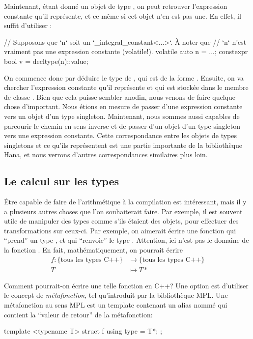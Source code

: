 Maintenant, étant donné un objet de type , on
peut retrouver l'expression constante qu'il représente, et ce même si cet objet
n'en est pas une. En effet, il suffit d'utiliser :
\begin{cpp}
    // Supposons que `n` soit un `_integral_constant<...>`. À noter que
    // `n` n'est vraiment pas une expression constante (volatile!).
    volatile auto n = ...;
    constexpr bool v = decltype(n)::value;
\end{cpp}

On commence donc par déduire le type de , qui est de la forme
. Ensuite, on va chercher l'expression
constante qu'il représente et qui est stockée dans le membre de classe
. Bien que cela puisse sembler anodin, nous venons de faire
quelque chose d'important. Nous étions en mesure de passer d'une expression
constante vers un objet d'un type singleton. Maintenant, nous sommes aussi
capables de parcourir le chemin en sens inverse et de passer d'un objet d'un
type singleton vers une expression constante. Cette correspondance entre les
objets de types singletons et ce qu'ils représentent est une partie importante
de la bibliothèque Hana, et nous verrons d'autres correspondances similaires
plus loin.


\subsection{Le calcul sur les types}
Être capable de faire de l'arithmétique à la compilation est intéressant, mais
il y a plusieurs autres choses que l'on souhaiterait faire. Par exemple, il
est souvent utile de manipuler des types comme s'ils étaient des objets, pour
effectuer des transformations sur ceux-ci. Par exemple, on aimerait écrire
une fonction  qui ``prend'' un type , et qui ``renvoie'' le
type . Attention, ici  n'est pas le domaine de la fonction
. En fait, mathématiquement, on pourrait écrire
\begin{align*}
    f : \{\text{tous les types C++}\} &\to \{\text{tous les types C++}\}\\
                             T &\mapsto T*
\end{align*}

Comment pourrait-on écrire une telle fonction en C++? Une option est d'utiliser
le concept de \textit{métafonction}, tel qu'introduit par la bibliothèque MPL.
Une métafonction au sens MPL est un template contenant un alias nommé
 qui contient la ``valeur de retour'' de la métafonction:
\begin{cpp}
    template <typename T>
    struct f {
        using type = T*;
    };
\end{cpp}

